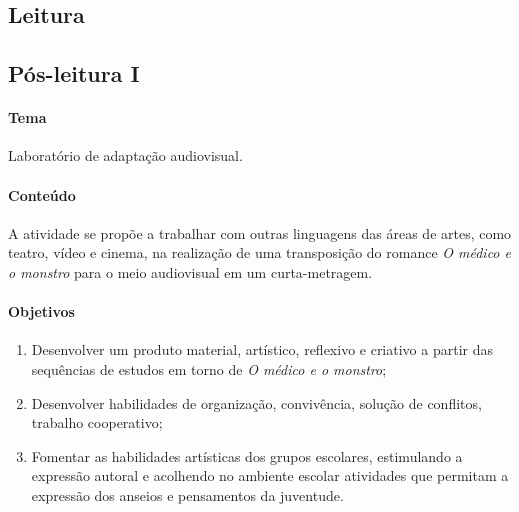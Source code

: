 \documentclass[12pt]{extarticle}
\begin{document}
\subsection{Leitura}

\subsection{Pós-leitura I}

\paragraph{Tema} Laboratório de adaptação audiovisual.


\paragraph{Conteúdo}
A atividade se propõe a trabalhar com outras linguagens das áreas de
artes, como teatro, vídeo e cinema, na realização de uma transposição do
romance \emph{O médico e o monstro} para o meio audiovisual em um
curta-metragem.

\paragraph{Objetivos}

\begin{enumerate}
\item
Desenvolver um produto material, artístico, reflexivo e criativo a
partir das sequências de estudos em torno de \emph{O médico e o
monstro};

\item
Desenvolver habilidades de organização, convivência,
solução de conflitos, trabalho cooperativo; 

\item
Fomentar as habilidades
artísticas dos grupos escolares, estimulando a expressão autoral e
acolhendo no ambiente escolar atividades que permitam a expressão dos
anseios e pensamentos da juventude.
\end{enumerate}
\end{document}

